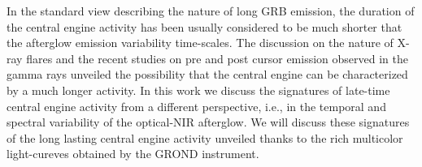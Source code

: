 


\bigskip



\bigskip

\noindent In the standard view describing the nature of long GRB emission, the duration of the central engine activity has been usually considered to be 
much shorter that the afterglow emission variability time-scales.
The discussion on the nature of X-ray flares and the recent studies on pre and post cursor emission observed in the gamma rays unveiled the possibility that the central engine can be characterized by a much longer activity. In this work we discuss the signatures of late-time central engine activity from a different perspective, i.e., in the temporal and spectral variability of the optical-NIR afterglow. We will discuss these signatures of the long lasting central engine activity unveiled thanks to the rich multicolor light-cureves obtained by the GROND instrument.

